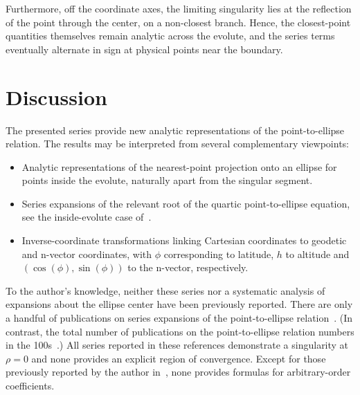 \documentclass[a4paper]{amsart}
\begin{document}
%
Furthermore, off the coordinate axes, the limiting singularity lies at the reflection of the point through the center, on a non-closest branch. Hence, the closest-point quantities themselves remain analytic across the evolute, and the series terms eventually alternate in sign at physical points near the boundary.

\section{Discussion}\label{sec:discussion}
The presented series provide new analytic representations of the point-to-ellipse relation. The results may be interpreted from several complementary viewpoints:
\begin{itemize}
\item Analytic representations of the nearest-point projection onto an ellipse for points inside the evolute, naturally apart from the singular segment.%
\item Series expansions of the relevant root of the quartic point-to-ellipse equation, see the inside-evolute case of~\cite{Vermeille2011}. %
\item Inverse-coordinate transformations linking Cartesian coordinates to geodetic and n-vector coordinates, with $\phi$ corresponding to latitude, $h$ to altitude and $(\cos(\phi),\sin(\phi))$ to the n-vector, respectively.
\end{itemize}
%
To the author's knowledge, neither these series nor a systematic analysis of expansions about the ellipse center have been previously reported. There are only a handful of publications on series expansions of the point-to-ellipse relation~\cite{
Morrison1961, %
Pick1967, %
Getchell1972, %
Long1975, %
Turner2013, %
Uteshev2018, %
Nilsson2025,
}. (In contrast, the total number of publications on the point-to-ellipse relation numbers in the 100s~\cite{Nilsson2024}.) All series reported in these references demonstrate a singularity at $\rho=0$ and none provides an explicit region of convergence. Except for those previously reported by the author in~\cite{Nilsson2025}, none provides formulas for arbitrary-order coefficients. %
\end{document}
